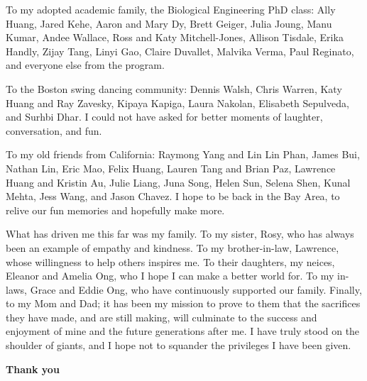 To my adopted academic family, the Biological Engineering PhD class: Ally Huang, Jared Kehe, Aaron and Mary Dy, Brett Geiger, Julia Joung, Manu Kumar, Andee Wallace, Ross and Katy Mitchell-Jones, Allison Tisdale, Erika Handly, Zijay Tang, Linyi Gao, Claire Duvallet, Malvika Verma, Paul Reginato, and everyone else from the program.

To the Boston swing dancing community: Dennis Walsh, Chris Warren, Katy Huang and Ray Zavesky, Kipaya Kapiga, Laura Nakolan, Elisabeth Sepulveda, and Surhbi Dhar. I could not have asked for better moments of laughter, conversation, and fun.

To my old friends from California: Raymong Yang and Lin Lin Phan, James Bui, Nathan Lin, Eric Mao, Felix Huang, Lauren Tang and Brian Paz, Lawrence Huang and Kristin Au, Julie Liang, Juna Song, Helen Sun, Selena Shen, Kunal Mehta, Jess Wang, and Jason Chavez. I hope to be back in the Bay Area, to relive our fun memories and hopefully make more.

What has driven me this far was my family. To my sister, Rosy, who has always been an example of empathy and kindness. To my brother-in-law, Lawrence, whose willingness to help others inspires me. To their daughters, my neices, Eleanor and Amelia Ong, who I hope I can make a better world for. To my in-laws, Grace and Eddie Ong, who have continuously supported our family. Finally, to my Mom and Dad; it has been my mission to prove to them that the sacrifices they have made, and are still making, will culminate to the success and enjoyment of mine and the future generations after me. I have truly stood on the shoulder of giants, and I hope not to squander the privileges I have been given.

\vspace{1.5\baselineskip}
\begin{center}
  \textbf{Thank you}
\end{center}
